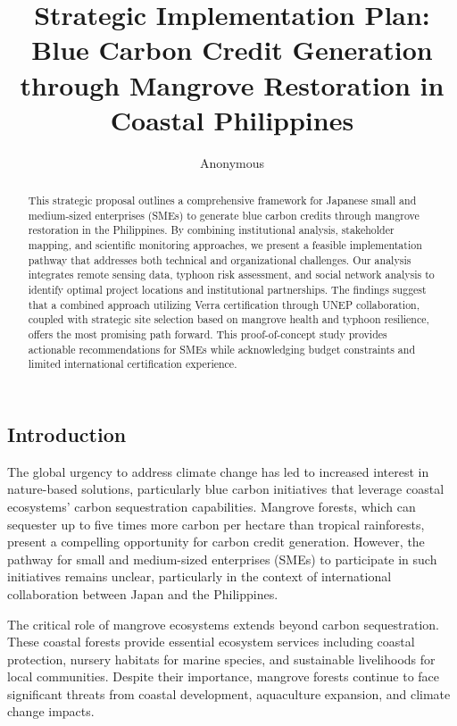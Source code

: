 \documentclass{article}
\title{Strategic Implementation Plan: Blue Carbon Credit Generation through Mangrove Restoration in Coastal Philippines}
\author{Anonymous}
\theoremstyle{plain}
\theoremstyle{definition}
\theoremstyle{remark}
\begin{document}
\begin{multicols}{2}

\maketitle

\begin{abstract}
This strategic proposal outlines a comprehensive framework for Japanese small and medium-sized enterprises (SMEs) to generate blue carbon credits through mangrove restoration in the Philippines. By combining institutional analysis, stakeholder mapping, and scientific monitoring approaches, we present a feasible implementation pathway that addresses both technical and organizational challenges. Our analysis integrates remote sensing data, typhoon risk assessment, and social network analysis to identify optimal project locations and institutional partnerships. The findings suggest that a combined approach utilizing Verra certification through UNEP collaboration, coupled with strategic site selection based on mangrove health and typhoon resilience, offers the most promising path forward. This proof-of-concept study provides actionable recommendations for SMEs while acknowledging budget constraints and limited international certification experience.
\end{abstract}

\section{Introduction}
The global urgency to address climate change has led to increased interest in nature-based solutions, particularly blue carbon initiatives that leverage coastal ecosystems' carbon sequestration capabilities. Mangrove forests, which can sequester up to five times more carbon per hectare than tropical rainforests, present a compelling opportunity for carbon credit generation. However, the pathway for small and medium-sized enterprises (SMEs) to participate in such initiatives remains unclear, particularly in the context of international collaboration between Japan and the Philippines.

The critical role of mangrove ecosystems extends beyond carbon sequestration. These coastal forests provide essential ecosystem services including coastal protection, nursery habitats for marine species, and sustainable livelihoods for local communities. Despite their importance, mangrove forests continue to face significant threats from coastal development, aquaculture expansion, and climate change impacts.


\end{multicols}
\end{document}
